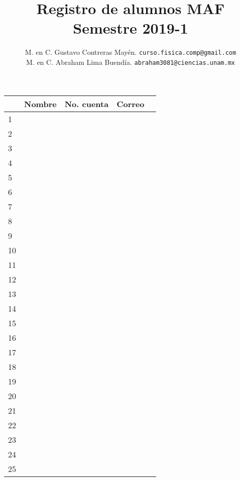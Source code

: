 \documentclass[12pt]{article}
\author{M. en C. Gustavo Contreras Mayén. \texttt{curso.fisica.comp@gmail.com}\\
M. en C. Abraham Lima Buendía. \texttt{abraham3081@ciencias.unam.mx}}
\title{Registro de alumnos MAF \\ {\large Semestre 2019-1}}
\date{ }
\begin{document}
\maketitle
\fontsize{14}{14}\selectfont
\hspace*{-2cm}
\begin{flushleft} 
\begin{tabular}{| l | >{\centering\arraybackslash}m{7cm}| >{\centering\arraybackslash}m{3.5cm}| >{\centering\arraybackslash}m{5cm} | c | } \hline
 & Nombre & No. cuenta & Correo \\
\hline 1 & & & \\
\hline 2 & & & \\
\hline 3 & & & \\
\hline 4 & & & \\
\hline 5 & & & \\
\hline 6 & & & \\
\hline 7 & & & \\
\hline 8 & & & \\
\hline 9 & & & \\
\hline 10 & & & \\
\hline 11 & & & \\
\hline 12 & & & \\
\hline 13 & & & \\
\hline 14 & & & \\
\hline 15 & & & \\
\hline 16 & & & \\
\hline 17 & & & \\
\hline 18 & & & \\
\hline 19 & & & \\
\hline 20 & & & \\
\hline 21 & & & \\
\hline 22 & & & \\
\hline 23 & & & \\
\hline 24 & & & \\
\hline 25 & & & \\ \hline
\end{tabular}
\end{flushleft}
\end{document}
